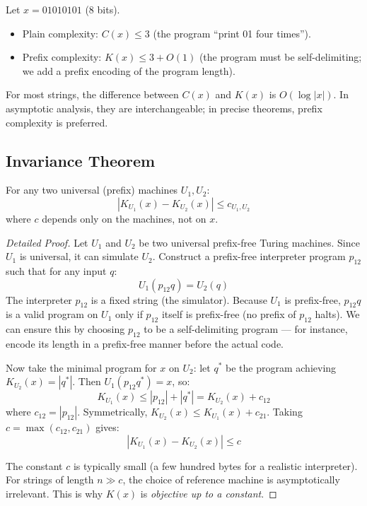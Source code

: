 \begin{example}
Let $x = 01010101$ (8 bits). 
\begin{itemize}
\item Plain complexity: $C(x) \le 3$ (the program ``print 01 four times'').
\item Prefix complexity: $K(x) \le 3 + O(1)$ (the program must be self-delimiting; we add a prefix encoding of the program length).
\end{itemize}
For most strings, the difference between $C(x)$ and $K(x)$ is $O(\log |x|)$. In asymptotic analysis, they are interchangeable; in precise theorems, prefix complexity is preferred.
\end{example}

\subsection{Invariance Theorem}
\label{sec:kolmogorov:invariance}

\begin{theorem}
For any two universal (prefix) machines $U_1, U_2$:
\[
|K_{U_1}(x) - K_{U_2}(x)| \le c_{U_1,U_2}
\]
where $c$ depends only on the machines, not on $x$.
\end{theorem}

\begin{proof}[Detailed Proof]
Let $U_1$ and $U_2$ be two universal prefix-free Turing machines. Since $U_1$ is universal, it can simulate $U_2$. Construct a prefix-free interpreter program $p_{12}$ such that for any input $q$:
\[
U_1(p_{12} q) = U_2(q)
\]
The interpreter $p_{12}$ is a fixed string (the simulator). Because $U_1$ is prefix-free, $p_{12} q$ is a valid program on $U_1$ only if $p_{12}$ itself is prefix-free (no prefix of $p_{12}$ halts). We can ensure this by choosing $p_{12}$ to be a self-delimiting program --- for instance, encode its length in a prefix-free manner before the actual code.

Now take the minimal program for $x$ on $U_2$: let $q^*$ be the program achieving $K_{U_2}(x) = |q^*|$. Then $U_1(p_{12} q^*) = x$, so:
\[
K_{U_1}(x) \le |p_{12}| + |q^*| = K_{U_2}(x) + c_{12}
\]
where $c_{12} = |p_{12}|$. Symmetrically, $K_{U_2}(x) \le K_{U_1}(x) + c_{21}$. Taking $c = \max(c_{12}, c_{21})$ gives:
\[
|K_{U_1}(x) - K_{U_2}(x)| \le c
\]

The constant $c$ is typically small (a few hundred bytes for a realistic interpreter). For strings of length $n \gg c$, the choice of reference machine is asymptotically irrelevant. This is why $K(x)$ is \emph{objective up to a constant}.
\end{proof}

